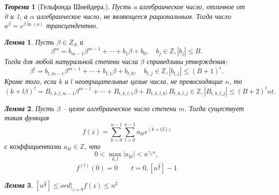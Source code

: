 \documentclass[a4paper,12pt]{article}
\newtheorem{teo2}{\textit{Теорема}}
\newtheorem{lem2}{\textit{Лемма}}
\newcommand{\AL}{\alpha}
\newcommand{\q}{\quad}
\newcommand{\bb}[1]{\mathbb{#1}}
\newcommand{\SL}{\sum\limits}
\begin{document}
\begin{formbox}{}
\begin{teo2}[Гельфонда Шнейдера.]
Пусть a алгебраическое число, отличное от 0 и 1, а $\AL$ алгебраическое число, не являющееся рациональным. Тогда число $a^\beta = e^{\beta \ln (a)}$ трансцендентно.
\end{teo2}
\end{formbox}
\begin{formbox}{}
\begin{lem2}
Пусть \(\beta\in Z_A\) и
\begin{equation}
\beta^m = b_{m-1}\beta^{m-1} + \cdots + b_1\beta + b_0, \q b_j \in \bb{Z}, |b_j| \le B.\end{equation}
Тогда для любой натуральной степени числа $\beta$ справедливы утверждения:\\
$$\beta^t = b_{t,m-1}\beta^{m-1} + \cdots + b_{t,1}\beta + b_{t,0},\q b_{t,j} \in \bb{Z}, |b_{t,j} | \le (B + 1)^t.$$
Кроме того, если $k$ и $l$ неотрицательные целые числа, не превосходящие $n$, то
\[(k + l\beta)^t = B_{t,k,l,m-1}\beta^{m-1} + \cdots + B_{t,k,l,1}\beta + B_{t,k,l,0}; B_{t,k,l,j}\in \bb{Z}, |B_{t,k,l,j} | \le (B + 2)^tnt.\]
\end{lem2}
\end{formbox}
\begin{formbox}{}
\begin{lem2} Пусть $\beta$ -- целое алгебраическое число степени $m$. Тогда существует такая функция \[f(z) = \SL_{k=0}^{n-1}\SL_{l=0}^{n-1} a_{kl}e^{(k+l\beta)z} \]
с коэффициентами $a_{kl}\in\bb{Z}$, что \[0 < \max\limits_{k,l}|a_{kl}|< n^{\gamma_5n},\] \[f^{(t)}(0) = 0\q\q t = \overline{0, [n^\frac{3}{2}]-1} \]
\end{lem2}
\end{formbox}
\begin{formbox}{}
\begin{lem2} $[n^\frac{3}{2}] \le ord|_{z=0}f(z) \le n^2$
\end{lem2}
\end{formbox}
\end{document}
